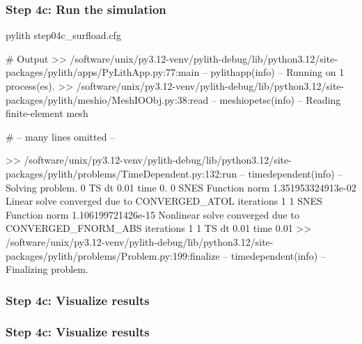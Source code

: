\documentclass[aspectratio=169]{beamer}
\begin{document}
\begin{frame}[fragile]
  \frametitle{Step 4c: Run the simulation}
  \summary{}

\begin{bashcode}
pylith step04c_surfload.cfg

# Output
 >> /software/unix/py3.12-venv/pylith-debug/lib/python3.12/site-packages/pylith/apps/PyLithApp.py:77:main
 -- pylithapp(info)
 -- Running on 1 process(es).
 >> /software/unix/py3.12-venv/pylith-debug/lib/python3.12/site-packages/pylith/meshio/MeshIOObj.py:38:read
 -- meshiopetsc(info)
 -- Reading finite-element mesh

# -- many lines omitted --

 >> /software/unix/py3.12-venv/pylith-debug/lib/python3.12/site-packages/pylith/problems/TimeDependent.py:132:run
 -- timedependent(info)
 -- Solving problem.
0 TS dt 0.01 time 0.
    0 SNES Function norm 1.351953324913e-02
      Linear solve converged due to CONVERGED_ATOL iterations 1
    1 SNES Function norm 1.106199721426e-15
    Nonlinear solve converged due to CONVERGED_FNORM_ABS iterations 1
1 TS dt 0.01 time 0.01
 >> /software/unix/py3.12-venv/pylith-debug/lib/python3.12/site-packages/pylith/problems/Problem.py:199:finalize
 -- timedependent(info)
 -- Finalizing problem.
\end{bashcode}
  
\end{frame}


\begin{frame}
  \frametitle{Step 4c: Visualize results}

    
\end{frame}


\begin{frame}
  \frametitle{Step 4c: Visualize results}

    
\end{frame}
\end{document}
